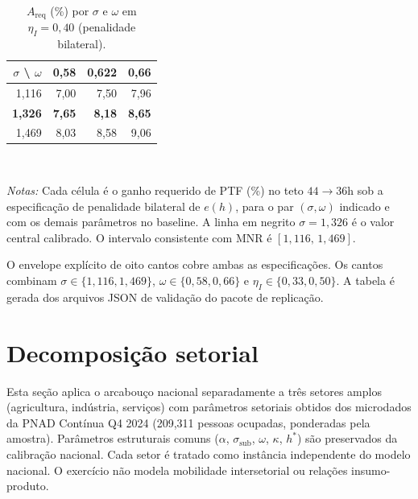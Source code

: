 \documentclass[12pt,a4paper]{article}
\begin{document}
\begin{table}[htbp]
\centering
\caption{$A_{\text{req}}$ (\%) por $\sigma$ e $\omega$ em $\eta_I=0{,}40$ (penalidade bilateral).}\label{tab:heatmap}
\small
\begin{tabular}{r|rrr}
\hline\hline
$\sigma$ \textbackslash{} $\omega$ & 0{,}58 & 0{,}622 & 0{,}66 \\
\hline
1{,}116 & 7{,}00 & 7{,}50 & 7{,}96 \\
\textbf{1{,}326} & \textbf{7{,}65} & \textbf{8{,}18} & \textbf{8{,}65} \\
1{,}469 & 8{,}03 & 8{,}58 & 9{,}06 \\
\hline\hline
\end{tabular}
\\[2pt]
\begin{minipage}{0.80\textwidth}
\justifying
{\footnotesize \textit{Notas:} Cada c\'elula \'e o ganho requerido de PTF (\%) no teto $44\to 36$h sob a especifica\c{c}\~ao de penalidade bilateral de $e(h)$, para o par $(\sigma,\omega)$ indicado e com os demais par\^ametros no baseline. A linha em negrito $\sigma=1{,}326$ \'e o valor central calibrado. O intervalo consistente com MNR \'e $[1{,}116,\,1{,}469]$.}
\end{minipage}
\end{table}

O envelope expl\'icito de oito cantos cobre ambas as especifica\c{c}\~oes. Os cantos combinam $\sigma\in\{1{,}116,1{,}469\}$, $\omega\in\{0{,}58,0{,}66\}$ e $\eta_I\in\{0{,}33,0{,}50\}$. A tabela \'e gerada dos arquivos JSON de valida\c{c}\~ao do pacote de replica\c{c}\~ao.



\clearpage
\section{Decomposi\c{c}\~ao setorial}\label{app:sectoral}

Esta se\c{c}\~ao aplica o arcabou\c{c}o nacional separadamente a tr\^es setores amplos (agricultura, ind\'ustria, servi\c{c}os) com par\^ametros setoriais obtidos dos microdados da PNAD Cont\'inua Q4 2024 (209{,}311 pessoas ocupadas, ponderadas pela amostra). Par\^ametros estruturais comuns ($\alpha$, $\sigma_{\text{sub}}$, $\omega$, $\kappa$, $h^*$) s\~ao preservados da calibra\c{c}\~ao nacional. Cada setor \'e tratado como inst\^ancia independente do modelo nacional. O exerc\'icio n\~ao modela mobilidade intersetorial ou rela\c{c}\~oes insumo-produto.
\end{document}
